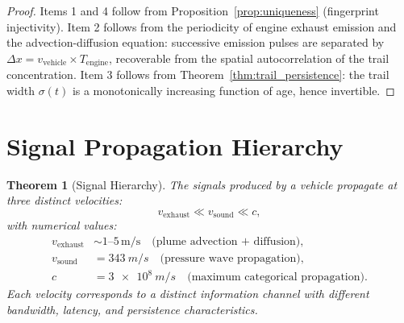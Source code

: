 \documentclass[11pt,twocolumn,a4paper]{article}
\theoremstyle{plain}
\newtheorem{theorem}{Theorem}[section]
\theoremstyle{definition}
\theoremstyle{remark}
\begin{document}
\begin{proof}
Items 1 and 4 follow from Proposition~\ref{prop:uniqueness} (fingerprint injectivity). Item 2 follows from the periodicity of engine exhaust emission and the advection-diffusion equation: successive emission pulses are separated by $\Delta x = v_{\mathrm{vehicle}} \times T_{\mathrm{engine}}$, recoverable from the spatial autocorrelation of the trail concentration. Item 3 follows from Theorem~\ref{thm:trail_persistence}: the trail width $\sigma(t)$ is a monotonically increasing function of age, hence invertible.
\end{proof}


\section{Signal Propagation Hierarchy}
\label{sec:signal_hierarchy}

\begin{theorem}[Signal Hierarchy]
\label{thm:signal_hierarchy}
The signals produced by a vehicle propagate at three distinct velocities:
\begin{equation}
v_{\mathrm{exhaust}} \ll v_{\mathrm{sound}} \ll c,
\label{eq:hierarchy}
\end{equation}
with numerical values:
\begin{align}
v_{\mathrm{exhaust}} &\sim 1\text{--}5\,\text{m/s} \quad\text{(plume advection + diffusion)}, \label{eq:v_exhaust}\\
v_{\mathrm{sound}} &= \SI{343}{m/s} \quad\text{(pressure wave propagation)}, \label{eq:v_sound}\\
c &= \SI{3e8}{m/s} \quad\text{(maximum categorical propagation)}. \label{eq:c_value}
\end{align}
Each velocity corresponds to a distinct information channel with different bandwidth, latency, and persistence characteristics.
\end{theorem}
\end{document}
